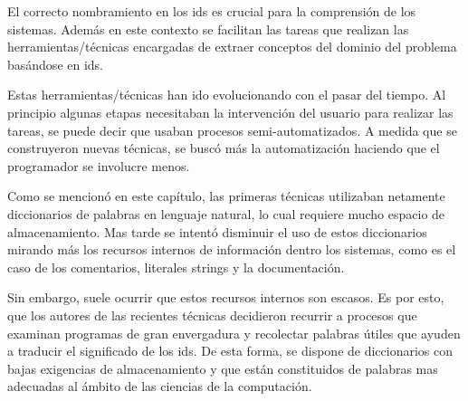 \documentclass[a4paper,12pt]{report}
\begin{document}
El correcto nombramiento en los ids es crucial para la comprensión de los sistemas. Además en este contexto se facilitan las tareas que realizan las herramientas/técnicas encargadas de extraer conceptos del dominio del problema basándose en ids. 

Estas herramientas/técnicas han ido evolucionando con el pasar del tiempo. Al principio algunas etapas necesitaban la intervención del usuario para realizar las tareas, se puede decir que usaban procesos semi-automatizados. A medida que se construyeron nuevas técnicas, se buscó más la automatización haciendo que el programador se involucre menos.

Como se mencionó en este capítulo, las primeras técnicas utilizaban netamente diccionarios de palabras en lenguaje natural, lo cual requiere mucho espacio de almacenamiento. Mas tarde se intentó disminuir el uso de estos diccionarios mirando más los recursos internos de información dentro los sistemas, como es el caso de los comentarios, literales strings y la documentación.

Sin embargo, suele ocurrir que estos recursos internos son escasos. Es por esto, que los autores de las recientes técnicas decidieron recurrir a procesos que examinan programas de gran envergadura y recolectar palabras útiles que ayuden a traducir el significado de los ids. De esta forma, se dispone de diccionarios con bajas exigencias de almacenamiento y que están constituidos de palabras mas adecuadas al ámbito de las ciencias de la computación.







\end{document}
